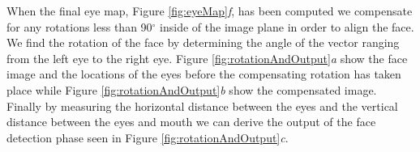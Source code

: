When the final eye map, Figure \ref{fig:eyeMap}\textit{f}, has been computed we compensate for any rotations less than 90$^{\circ}$ inside of the image plane in order to align the face. We find the rotation of the face by determining the angle of the vector ranging from the left eye to the right eye. Figure \ref{fig:rotationAndOutput}\textit{a} show the face image and the locations of the eyes before the compensating rotation has taken place while Figure \ref{fig:rotationAndOutput}\textit{b} show the compensated image. Finally by measuring the horizontal distance between the eyes and the vertical distance between the eyes and mouth we can derive the output of the face detection phase seen in Figure \ref{fig:rotationAndOutput}\textit{c}.

\begin{figure}[H]
\centering


\end{figure}
